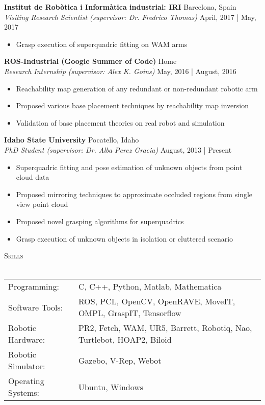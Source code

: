 \documentclass[a4paper]{article}
\newcommand{\lineunder} {
    \vspace*{-8pt} \\
    \hspace*{-18pt} \hrulefill \\
}
\newcommand{\header} [1] {
    {\hspace*{-18pt}\vspace*{6pt} \textsc{#1}}
    \vspace*{-6pt} \lineunder
}
\begin{document}
\textbf{Institut de Robòtica i Informàtica industrial: IRI} \hfill Barcelona, Spain\\
\textit{Visiting Research Scientist (supervisor: Dr. Fredrico Thomas)} \hfill April, 2017 | May, 2017\\
\vspace{-1mm}
\begin{itemize} \itemsep 1pt
	\item Grasp execution of superquadric fitting on WAM arms
\end{itemize}

\textbf{ROS-Industrial (Google Summer of Code)} \hfill Home\\
\textit{Research Internship (supervisor: Alex K. Goins)} \hfill May, 2016 | August, 2016\\
\vspace{-1mm}
\begin{itemize} \itemsep 1pt
	\item Reachability map generation of any redundant or non-redundant robotic arm
	\item Proposed various base placement techniques by reachability map inversion
	\item Validation of base placement theories on real robot and simulation
\end{itemize}

\textbf{Idaho State University} \hfill Pocatello, Idaho\\
\textit{PhD Student (supervisor: Dr. Alba Perez Gracia)} \hfill August, 2013 | Present\\
\vspace{-1mm}
\begin{itemize} \itemsep 1pt
	\item Superquadric fitting and pose estimation of unknown objects from point cloud data
	\item Proposed mirroring techniques to approximate occluded regions from single view point cloud
	\item Proposed novel grasping algorithms for superquadrics
	\item Grasp execution of unknown objects in isolation or cluttered scenario
\end{itemize}

\header{Skills}
\begin{tabular}{ l l }
	Programming:       & C, C++, Python, Matlab, Mathematica                                   \\
	Software Tools:    & ROS, PCL, OpenCV, OpenRAVE, MoveIT, OMPL, GraspIT, Tensorflow         \\
	Robotic Hardware:  & PR2, Fetch, WAM, UR5, Barrett, Robotiq, Nao, Turtlebot, HOAP2, Biloid \\
	Robotic Simulator: & Gazebo, V-Rep, Webot                                                  \\
	Operating Systems: & Ubuntu, Windows                                                       \\
\end{tabular}
\end{document}
